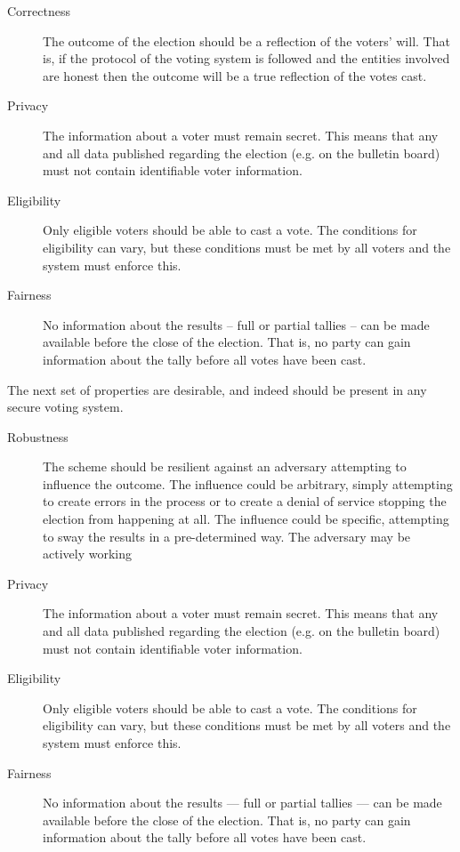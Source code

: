 \begin{description}
    \item[Correctness] The outcome of the election should be a reflection of the voters' will. That is, if the protocol of the voting system is followed and the entities involved are honest then the outcome will be a true reflection of the votes cast.
    \item[Privacy] The information about a voter must remain secret. This means that any and all data published regarding the election (e.g. on the bulletin board) must not contain identifiable voter information.
    \item[Eligibility] Only eligible voters should be able to cast a vote. The conditions for eligibility can vary, but these conditions must be met by all voters and the system must enforce this.
    \item[Fairness] No information about the results -- full or partial tallies -- can be made available before the close of the election. That is, no party can gain information about the tally before all votes have been cast.
\end{description}

The next set of properties are desirable, and indeed should be present in any secure voting system.

\begin{description}
    \item[Robustness] The scheme should be resilient against an adversary attempting to influence the outcome. The influence could be arbitrary, simply attempting to create errors in the process or to create a denial of service stopping the election from happening at all. The influence could be specific, attempting to sway the results in a pre-determined way. The adversary may be actively working
    \item[Privacy] The information about a voter must remain secret. This means that any and all data published regarding the election (e.g. on the bulletin board) must not contain identifiable voter information.
    \item[Eligibility] Only eligible voters should be able to cast a vote. The conditions for eligibility can vary, but these conditions must be met by all voters and the system must enforce this.
    \item[Fairness] No information about the results --- full or partial tallies --- can be made available before the close of the election. That is, no party can gain information about the tally before all votes have been cast.
\end{description}


